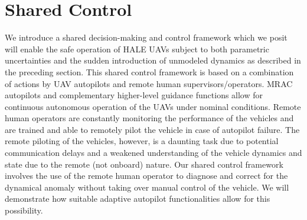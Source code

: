 \documentclass[english]{ifacconf}
\begin{document}


\section{Shared Control}
We introduce a shared decision-making and control framework which we posit will enable the safe operation of HALE UAVs subject to both parametric uncertainties and the sudden introduction of unmodeled dynamics as described in the preceding section. This shared control framework is based on a combination of actions by UAV autopilots and remote human supervisors/operators. MRAC autopilots and complementary higher-level guidance functions allow for continuous autonomous operation of the UAVs under nominal conditions. Remote human operators are constantly monitoring the performance of the vehicles and are trained and able to remotely pilot the vehicle in case of autopilot failure. The remote piloting of the vehicles, however, is a daunting task due to potential communication delays and a weakened understanding of the vehicle dynamics and state due to the remote (not onboard) nature. Our shared control framework involves the use of the remote human operator to diagnose and correct for the dynamical anomaly without taking over manual control of the vehicle. We will demonstrate how suitable adaptive autopilot functionalities allow for this possibility.

\end{document}
